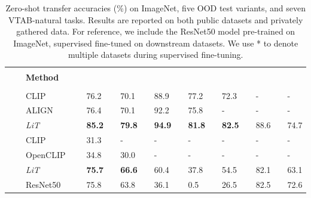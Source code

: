 \documentclass[10pt,twocolumn,letterpaper]{article}
\def \lit {LiT\xspace}
\def\objsota{82.5}
\begin{document}
\begin{table}[t]
  \setlength{\tabcolsep}{0pt}
  \setlength{\extrarowheight}{5pt}
  \renewcommand{\arraystretch}{0.75}
  \centering
\begin{tabularx}{\linewidth}{p{0.1cm}p{0.5cm}Cp{1.5cm}Cp{0.1cm}Cp{0.1cm}Cp{0.1cm}Cp{0.1cm}Cp{0.1cm}Cp{0.1cm}C}
    \toprule[1pt]
\bf{}  &&  &&  &&  &&  &&
     &&
     &&  &&
     \\
    && \bf{Method} &&\\
    \\
    \midrule
     && CLIP~\cite{clip} && 76.2 && 70.1 && 88.9 && 77.2 && 72.3 && - && - \\
     && ALIGN~\cite{align} && 76.4 && 70.1 && 92.2 && 75.8 && - && - && -\\
     && \mbox{\textit{\lit{}}} && \bf{85.2} && \bf{79.8} && \bf{94.9} && \bf{81.8} && \bf{\objsota{}} && 88.6 && 74.7\\
     \midrule
      && CLIP~\cite{clip} && 31.3 && - && - && - && - && - && -\\
     && OpenCLIP~\cite{openclip} && 34.8 && 30.0 && - && - && - && - && - \\
&& \mbox{\textit{LiT}} && \bf{75.7} && \bf{66.6} && 60.4 && 37.8 && 54.5 && 82.1 && 63.1\\
     \midrule
      && ResNet50~\cite{resnet} && 75.8 && 63.8 && 36.1 && 0.5 && 26.5 && 82.5 && 72.6 \\
    \bottomrule[1pt]
  \end{tabularx}
  \caption{Zero-shot transfer accuracies (\%) on ImageNet,  five OOD test variants, and seven VTAB-natural tasks. Results are reported on both public datasets and privately gathered data. For reference, we include the ResNet50 model pre-trained on ImageNet, supervised fine-tuned on downstream datasets. We use * to denote multiple datasets during supervised fine-tuning.
  }\label{table:sota}
\end{table}
\end{document}
